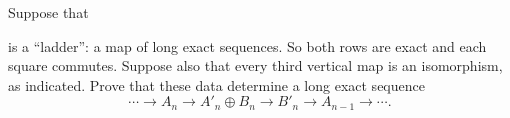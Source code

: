 \documentclass[11pt,letterpaper]{article}
\begin{document}
\begin{problem} Suppose that
    \medskip
    \begin{center}
    \end{center}
    \medskip
    is a “ladder”: a map of long exact sequences. So both rows are exact and each square commutes. Suppose also that every third vertical map is an isomorphism, as indicated. Prove that these data determine a long exact sequence
    \[
        \cdots \to A_n \to A'_n\oplus B_n \to B'_n \to A_{n-1} \to \cdots
    .\] 
\end{problem}
\end{document}
